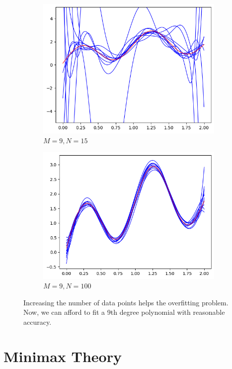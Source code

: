 \documentclass{article}
\begin{document}
\begin{example}
    \begin{figure}[H]
      \centering
      \begin{subfigure}[b]{0.48\textwidth}
      \centering
        \includegraphics[width=\textwidth]{img/poly_9_fit.png}
        \caption{$M = 9, N = 15$}
        \label{fig:less_points}
      \end{subfigure}
      \hfill 
      \begin{subfigure}[b]{0.48\textwidth}
      \centering
        \includegraphics[width=\textwidth]{img/increased_data.png}
        \caption{$M = 9, N = 100$}
        \label{fig:more_points}
      \end{subfigure}
      \caption{Increasing the number of data points helps the overfitting problem. Now, we can afford to fit a 9th degree polynomial with reasonable accuracy.}
      \label{fig:reducing_overfitting_with_more_samples}
    \end{figure}
    
  \end{example}

\section{Minimax Theory}



\end{document}

